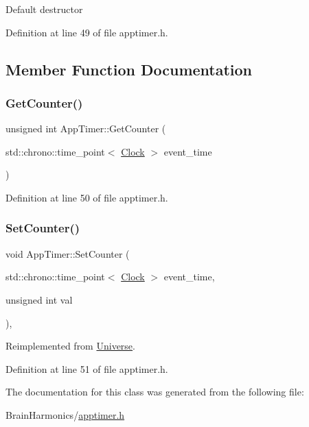 Default destructor 

Definition at line 49 of file apptimer.\+h.



\subsection{Member Function Documentation}
\mbox{\label{class_app_timer_ab9bb2b5f283b02d6d2292e064ddbd2ab}} 
\subsubsection{\texorpdfstring{Get\+Counter()}{GetCounter()}}
{\footnotesize\ttfamily unsigned int App\+Timer\+::\+Get\+Counter (\begin{DoxyParamCaption}\item[{std\+::chrono\+::time\+\_\+point$<$ \hyperlink{universe_8h_a0ef8d951d1ca5ab3cfaf7ab4c7a6fd80}{Clock} $>$}]{event\+\_\+time }\end{DoxyParamCaption})\hspace{0.3cm}{\ttfamily [inline]}}



Definition at line 50 of file apptimer.\+h.

\mbox{\label{class_app_timer_a77d5d447d6b136a35304b0571a166ddc}} 
\subsubsection{\texorpdfstring{Set\+Counter()}{SetCounter()}}
{\footnotesize\ttfamily void App\+Timer\+::\+Set\+Counter (\begin{DoxyParamCaption}\item[{std\+::chrono\+::time\+\_\+point$<$ \hyperlink{universe_8h_a0ef8d951d1ca5ab3cfaf7ab4c7a6fd80}{Clock} $>$}]{event\+\_\+time,  }\item[{unsigned int}]{val }\end{DoxyParamCaption})\hspace{0.3cm}{\ttfamily [inline]}, {\ttfamily [virtual]}}



Reimplemented from \hyperlink{class_universe_aa22202ae740eb1355529afcb13285e91}{Universe}.



Definition at line 51 of file apptimer.\+h.



The documentation for this class was generated from the following file\+:\begin{DoxyCompactItemize}
\item 
Brain\+Harmonics/\hyperlink{apptimer_8h}{apptimer.\+h}\end{DoxyCompactItemize}
